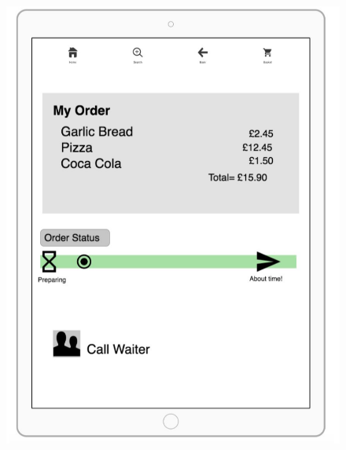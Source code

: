 \documentclass[11pt, a4paper]{report}
\begin{document}
\begin{figure}
\centering
\includegraphics[scale=0.8]{Figures/Customer2.png}
\end{figure}

\printbibliography
\end{document}
